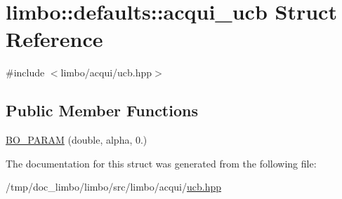 \hypertarget{structlimbo_1_1defaults_1_1acqui__ucb}{}\section{limbo\+:\+:defaults\+:\+:acqui\+\_\+ucb Struct Reference}
\label{structlimbo_1_1defaults_1_1acqui__ucb}


{\ttfamily \#include $<$limbo/acqui/ucb.\+hpp$>$}

\subsection*{Public Member Functions}
\begin{DoxyCompactItemize}
\item 
\hyperlink{group__acqui__defaults_ga1f72be83648befc624f5468668e5728a}{B\+O\+\_\+\+P\+A\+R\+AM} (double, alpha, 0.)
\end{DoxyCompactItemize}


The documentation for this struct was generated from the following file\+:\begin{DoxyCompactItemize}
\item 
/tmp/doc\+\_\+limbo/limbo/src/limbo/acqui/\hyperlink{ucb_8hpp}{ucb.\+hpp}\end{DoxyCompactItemize}
